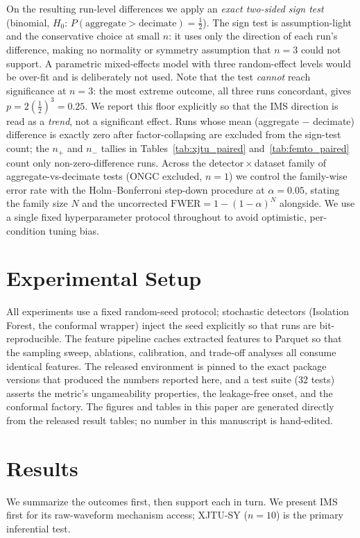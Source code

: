 \documentclass[journal]{IEEEtran}
\begin{document}
On the resulting run-level differences we apply an \emph{exact two-sided sign
test} (binomial, $H_0\!:\,P(\text{aggregate}>\text{decimate})=\tfrac12$). The
sign test is assumption-light and the conservative choice at small $n$: it uses
only the direction of each run's difference, making no normality or
symmetry assumption that $n{=}3$ could not support. A parametric mixed-effects
model with three random-effect levels would be over-fit and is deliberately not
used. Note that the test \emph{cannot} reach significance at $n{=}3$: the most
extreme outcome, all three runs concordant, gives $p=2(\tfrac12)^3=0.25$. We
report this floor explicitly so that the IMS direction is read as a
\emph{trend}, not a significant effect. Runs whose mean (aggregate $-$ decimate)
difference is exactly zero after factor-collapsing are excluded from the sign-test
count; the $n_{+}$ and $n_{-}$ tallies in Tables~\ref{tab:xjtu_paired}
and~\ref{tab:femto_paired} count only non-zero-difference runs. Across the detector\,$\times$\,dataset
family of aggregate-vs-decimate tests (ONGC excluded, $n{=}1$) we control the
family-wise error rate with the Holm--Bonferroni step-down procedure at
$\alpha{=}0.05$, stating the family size $N$ and the uncorrected
$\mathrm{FWER}=1-(1-\alpha)^N$ alongside. We use a single fixed hyperparameter
protocol throughout to avoid optimistic, per-condition tuning bias.

\section{Experimental Setup}
All experiments use a fixed random-seed protocol; stochastic detectors
(Isolation Forest, the conformal wrapper) inject the seed explicitly so that
runs are bit-reproducible. The feature pipeline caches extracted features to
Parquet so that the sampling sweep, ablations, calibration, and trade-off
analyses all consume identical features. The released environment is pinned to
the exact package versions that produced the numbers reported here, and a test
suite (32 tests) asserts the metric's ungameability properties, the
leakage-free onset, and the conformal factory. The figures and tables in this
paper are generated directly from the released result tables; no number in this
manuscript is hand-edited.

\section{Results}
We summarize the outcomes first, then support each in turn. We present IMS first
for its raw-waveform mechanism access; XJTU-SY ($n{=}10$) is the primary
inferential test.
\end{document}
